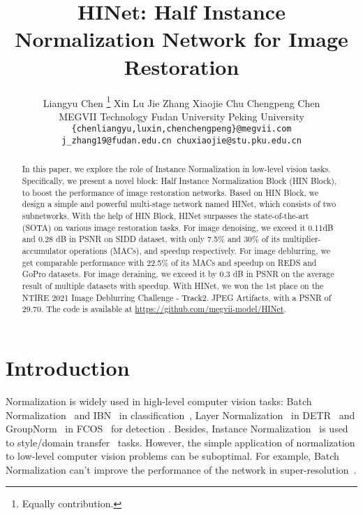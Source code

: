 \documentclass[final]{cvpr}
\begin{document}
\title{HINet: Half Instance Normalization Network for Image Restoration}

\author{Liangyu Chen \thanks{Equally contribution.}\hspace{20pt} Xin Lu \footnotemark[1] \hspace{20pt} Jie Zhang\hspace{20pt} Xiaojie Chu \hspace{20pt} Chengpeng Chen\\ 
{} MEGVII Technology \hspace{20pt} {} Fudan University \hspace{20pt} {} Peking University\\
{\tt\small \{chenliangyu,luxin,chenchengpeng\}@megvii.com}\\
{\tt\small j\_zhang19@fudan.edu.cn \hspace{20pt} chuxiaojie@stu.pku.edu.cn}\\
}
\maketitle


\begin{abstract}
   In this paper, we explore the role of Instance Normalization in low-level vision tasks. Specifically, we present a novel block: Half Instance Normalization Block (HIN Block), to boost the performance of image restoration networks. 
   Based on HIN Block, we design a simple and powerful multi-stage network named HINet, which consists of two subnetworks. With the help of HIN Block, HINet surpasses the state-of-the-art (SOTA) on various image restoration tasks. For image denoising, we exceed it 0.11dB and 0.28 dB in PSNR on SIDD dataset, with only 7.5\% and 30\% of its multiplier-accumulator operations (MACs),  and  speedup respectively. For image deblurring, we get comparable performance with 22.5\% of its MACs and  speedup on REDS and GoPro datasets. For image deraining, we exceed it by 0.3 dB in PSNR on the average result of multiple datasets with  speedup. With HINet, we won the 1st place on the NTIRE 2021 Image Deblurring Challenge - Track2. JPEG Artifacts, with a PSNR of 29.70. The code is available at \url{https://github.com/megvii-model/HINet}.
\end{abstract}

\vspace{-0.2cm}
\section{Introduction}
Normalization is widely used in high-level computer vision tasks: Batch Normalization~\cite{ioffe2015batch} and IBN~\cite{pan2018two} in classification~\cite{ma2018shufflenet}, Layer Normalization~\cite{ba2016layer} in DETR~\cite{carion2020end} and GroupNorm~\cite{wu2018group} in FCOS~\cite{tian2019fcos} for detection \etc. Besides, Instance Normalization~\cite{ulyanov2017improved} is used to style/domain transfer~\cite{pan2018two, huang2017arbitrary} tasks. However, the simple application of normalization to low-level computer vision problems can be suboptimal. For example, Batch Normalization can't improve the performance of the network in super-resolution~\cite{lim2017enhanced}.
\end{document}
